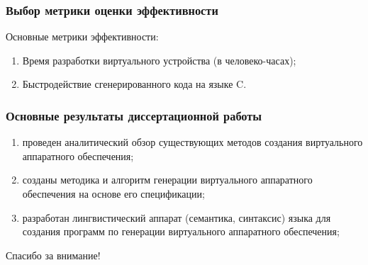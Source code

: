 \begin{frame}%
    \frametitle{Выбор метрики оценки эффективности}
    Основные метрики эффективности:
    \begin{enumerate}
        \item Время разработки виртуального устройства (в человеко-часах);
        \item Быстродействие сгенерированного кода на языке C.
    \end{enumerate}
\end{frame}


\begin{frame}%
    \frametitle{Основные результаты диссертационной работы}
    \begin{enumerate}
        \item проведен аналитический обзор существующих методов создания виртуального аппаратного обеспечения;
        \item созданы методика и алгоритм генерации виртуального аппаратного обеспечения на основе его спецификации;
        \item разработан лингвистический аппарат (семантика, синтаксис) языка для создания программ по генерации виртуального
            аппаратного обеспечения;
    \end{enumerate}
\end{frame}


\begin{frame}%
    \begin{center}
        \Huge Спасибо за внимание!
    \end{center}
\end{frame}
